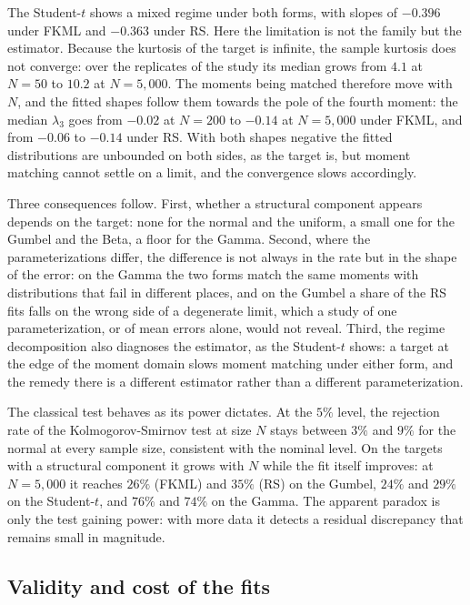 The Student-$t$ shows a mixed regime under both forms, with slopes of $-0.396$
under FKML and $-0.363$ under RS. Here the limitation is not the family but the
estimator. Because the kurtosis of the target is infinite, the sample kurtosis
does not converge: over the replicates of the study its median grows from $4.1$
at $N = 50$ to $10.2$ at $N = 5{,}000$. The moments being matched therefore move
with $N$, and the fitted shapes follow them towards the pole of the fourth
moment: the median $\lambda_3$ goes from $-0.02$ at $N = 200$ to $-0.14$ at
$N = 5{,}000$ under FKML, and from $-0.06$ to $-0.14$ under RS. With both shapes negative the fitted
distributions are unbounded on both sides, as the target is, but moment matching
cannot settle on a limit, and the convergence slows accordingly.

Three consequences follow. First, whether a structural component appears depends
on the target: none for the normal and the uniform, a small one for the Gumbel
and the Beta, a floor for the Gamma. Second, where the parameterizations differ,
the difference is not always in the rate but in the shape of the error: on the
Gamma the two forms match the same moments with distributions that fail in
different places, and on the Gumbel a share of the RS fits falls on the wrong
side of a degenerate limit, which a study of one parameterization, or of mean errors
alone, would not reveal. Third, the regime decomposition also diagnoses
the estimator, as the Student-$t$ shows: a target at the edge of the moment
domain slows moment matching under either form, and the remedy there is a
different estimator rather than a different parameterization.

The classical test behaves as its power dictates. At the $5\%$ level, the
rejection rate of the Kolmogorov-Smirnov test at size $N$ stays between $3\%$ and
$9\%$ for the normal at every sample size, consistent with the nominal level. On
the targets with a structural component it grows with $N$ while the fit itself
improves: at $N = 5{,}000$ it reaches $26\%$ (FKML) and $35\%$ (RS) on the Gumbel,
$24\%$ and $29\%$ on the Student-$t$, and $76\%$ and $74\%$ on the Gamma. The
apparent paradox is only the test gaining power: with more data it detects a
residual discrepancy that remains small in magnitude.

\subsection{Validity and cost of the fits}\label{subsec:validity_results}

